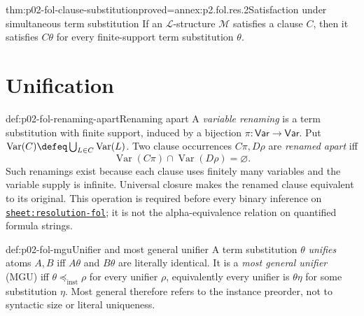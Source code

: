 \begin{hblemma}{thm:p02-fol-clause-substitution}{proved=annex:p2.fol.res.2}{Satisfaction under simultaneous term substitution}
If an \(\mathcal L\)-structure \(\mathcal M\) satisfies a clause \(C\),
then it satisfies \(C\theta\) for every finite-support term substitution
\(\theta\).
\end{hblemma}

\section{Unification}
\label{sec:p02-fol-unification}

\begin{hbdefinition}{def:p02-fol-renaming-apart}{Renaming apart}
A \emph{variable renaming} is a term substitution
with finite support, induced by
a bijection \(\pi:\mathsf{Var}\to\mathsf{Var}\).  Put
\(\operatorname{Var}(C)\defeq
  \bigcup_{L\in C}\operatorname{Var}(L)\).
Two clause occurrences \(C\pi,D\rho\) are
\emph{renamed apart} iff
\[
 \operatorname{Var}(C\pi)\cap\operatorname{Var}(D\rho)=\varnothing.
\]
Such renamings exist because each
clause uses finitely many variables and the variable supply is infinite.
Universal closure makes the renamed clause equivalent to its original.
This operation is required before every binary inference on
\hyperref[sheet:resolution-fol]{\texttt{sheet:resolution-fol}}; it is not the
alpha-equivalence relation on quantified formula strings.
\end{hbdefinition}

\begin{hbdefinition}{def:p02-fol-mgu}{Unifier and most general unifier}
A term substitution \(\theta\) \emph{unifies} atoms \(A,B\) iff
\(A\theta\) and \(B\theta\) are literally identical.  It is a
\emph{most general unifier} (MGU) iff
\(\theta\preceq_{\mathrm{inst}}\rho\) for every unifier \(\rho\),
equivalently every unifier is \(\theta\eta\) for some substitution
\(\eta\).  Most general therefore refers to the instance preorder, not to
syntactic size or literal uniqueness.
\end{hbdefinition}

